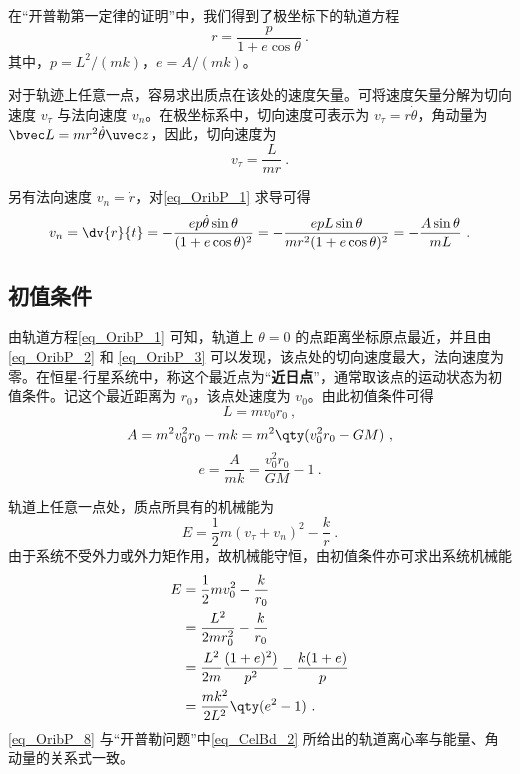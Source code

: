 

在“开普勒第一定律的证明”中，我们得到了极坐标下的轨道方程
\begin{equation}\label{eq_OribP_1} 
r=\frac{p}{1+e \cos\theta}~.
\end{equation}
其中，$p=L^2/(mk)$，$e=A/(mk)$。

对于轨迹上任意一点，容易求出质点在该处的速度矢量。可将速度矢量分解为切向速度 $v_\tau$ 与法向速度 $v_n$。在极坐标系中，切向速度可表示为 $v_\tau =r \dot\theta$，角动量为 $\bvec L  = mr^2\dot{\theta}\uvec z$，因此，切向速度为
\begin{equation}\label{eq_OribP_2} 
v_\tau =\frac{L}{mr}~.
\end{equation}

另有法向速度 $v_n=\dot r$，对\autoref{eq_OribP_1} 求导可得
\begin{equation} \label{eq_OribP_3}
v_n =\dv{r}{t}=-\frac{ep\dot{\theta}\sin\theta}{(1+e\cos\theta)^2}=-\frac{epL\sin\theta}{mr^2(1+e\cos\theta)^2}=-\frac{A\sin\theta}{mL}~.
\end{equation}

\subsection{初值条件}
由轨道方程\autoref{eq_OribP_1} 可知，轨道上 $\theta=0$ 的点距离坐标原点最近，并且由\autoref{eq_OribP_2} 和 \autoref{eq_OribP_3} 可以发现，该点处的切向速度最大，法向速度为零。在恒星-行星系统中，称这个最近点为“\textbf{近日点}”，通常取该点的运动状态为初值条件。记这个最近距离为 $r_0$，该点处速度为 $v_0$。由此初值条件可得
\begin{equation}
L = mv_0r_0~,
\end{equation}
\begin{equation}
A = m^2v_0^2r_0-mk=m^2\qty(v_0^2r_0-GM)~,
\end{equation}
\begin{equation}
e = \frac{A}{mk}=\frac{v_0^2r_0}{GM}-1 ~.
\end{equation}

轨道上任意一点处，质点所具有的机械能为
\begin{equation} 
E =\frac{1}{2}m(v_{\tau}+v_n)^2-\frac{k}{r}~.
\end{equation}
由于系统不受外力或外力矩作用，故机械能守恒，由初值条件亦可求出系统机械能
\begin{equation} \label{eq_OribP_8}
\begin{aligned}
E &=\frac{1}{2}mv_0^2-\frac{k}{r_0}\\
   &=\frac{L^2}{2mr_0^2}-\frac{k}{r_0}\\
   &=\frac{L^2}{2m}\frac{(1+e)^2)}{p^2}-\frac{k(1+e)}{p}\\
   &=\frac{mk^2}{2L^2}\qty(e^2-1)~.
\end{aligned}
\end{equation}
\autoref{eq_OribP_8} 与“开普勒问题”中\autoref{eq_CelBd_2} 所给出的轨道离心率与能量、角动量的关系式一致。

